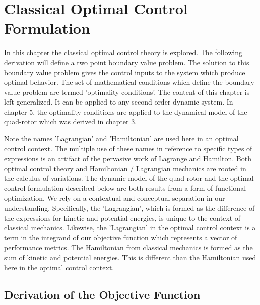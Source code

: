 
\chapter{Classical Optimal Control Formulation} %

\label{Chapter4} %


In this chapter the classical optimal control theory is explored. The following derivation will define a two point boundary value problem. The solution to this boundary value problem gives the control inputs to the system which produce optimal behavior. The set of mathematical conditions which define the boundary value problem are termed 'optimality conditions'. The content of this chapter is left generalized. It can be applied to any second order dynamic system. In chapter 5, the optimality conditions are applied to the dynamical model of the quad-rotor which was derived in chapter 3.

Note the names 'Lagrangian' and 'Hamiltonian' are used here in an optimal control context. The multiple use of these names in reference to specific types of expressions is an artifact of the pervasive work of Lagrange and Hamilton. Both optimal control theory and Hamiltonian / Lagrangian mechanics are rooted in the calculus of variations. The dynamic model of the quad-rotor and the optimal control formulation described below are both results from a form of functional optimization. We rely on a contextual and conceptual separation in our understanding. Specifically, the 'Lagrangian', which is formed as the difference of the expressions for kinetic and potential energies, is unique to the context of classical mechanics. Likewise, the 'Lagrangian' in the optimal control context is a term in the integrand of our objective function which represents a vector of performance metrics. The Hamiltonian from classical mechanics is formed as the sum of kinetic and potential energies. This is different than the Hamiltonian used here in the optimal control context.
 


\section{Derivation of the Objective Function}

